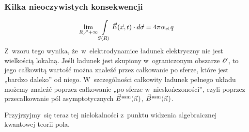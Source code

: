 \documentclass[10pt,t]{beamer}
\begin{document}
\begin{frame}
  \frametitle{Kilka nieoczywistych konsekwencji}




  \begin{equation}
    \label{eq:Glowne-rodzaje-problemow-podczerwonych-11}
    \lim_{ R \nearrow +\infty } \int\limits_{ S( R ) } \vec{E}( \vec{x}, t ) \cdot d\vec{ \sigma } =
    4 \pi \alpha_{ \hspace{0.09em} \text{el} } \hspace{0.09em} q
  \end{equation}
  Z~wzoru tego wynika, że~w~elektrodynamice ładunek
  elektryczny nie jest wielkością lokalną. Jeśli ładunek jest skupiony
  w~ograniczonym obszarze $\mathcal{O}$, to jego \alert{całkowitą} wartość można
  znaleźć przez całkowanie po sferze, które jest „bardzo daleko” od niego.
  W~szczególności całkowity ładunek pełnego układu możemy znaleźć poprzez
  całkowanie „po sferze w~nieskończoności”, czyli poprzez przecałkowanie pól
  asymptotycznych $\vec{E}^{ \hspace{0.05em} \text{asm} }( \vec{n} \hspace{0.05em} )$, $\vec{B}^{ \hspace{0.05em} \text{asm} }( \vec{n} \hspace{0.05em} )$.

  Przyjrzyjmy~się teraz tej nielokalności z~punktu widzenia algebraicznej
  kwantowej teorii pola.

\end{frame}
\end{document}
